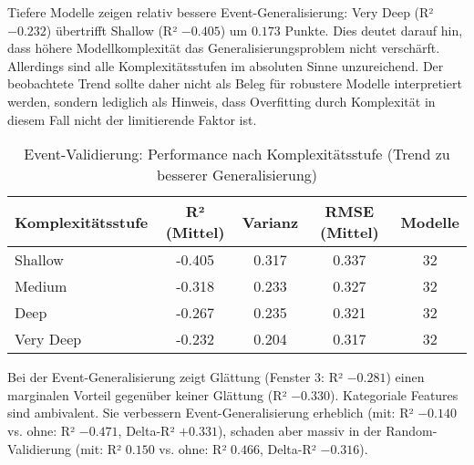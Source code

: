 Tiefere Modelle zeigen relativ bessere Event-Generalisierung: Very Deep (R² $-0.232$) übertrifft Shallow (R² $-0.405$) um $0.173$ Punkte. Dies deutet darauf hin, dass höhere Modellkomplexität das Generalisierungsproblem nicht verschärft. Allerdings sind alle Komplexitätsstufen im absoluten Sinne unzureichend. Der beobachtete Trend sollte daher nicht als Beleg für robustere Modelle interpretiert werden, sondern lediglich als Hinweis, dass Overfitting durch Komplexität in diesem Fall nicht der limitierende Faktor ist.

\begin{table}[H]
  \centering
  \begin{tabular}{lcccc}
    \toprule
    \textbf{Komplexitätsstufe} & \textbf{R² (Mittel)} & \textbf{Varianz} & \textbf{RMSE (Mittel)} & \textbf{Modelle} \\
    \midrule
    Shallow & -0.405 & 0.317 & 0.337 & 32 \\
    Medium & -0.318 & 0.233 & 0.327 & 32 \\
    Deep & -0.267 & 0.235 & 0.321 & 32 \\
    Very Deep & -0.232 & 0.204 & 0.317 & 32 \\
    \bottomrule
  \end{tabular}
  \caption{Event-Validierung: Performance nach Komplexitätsstufe (Trend zu besserer Generalisierung)}
  \label{tab:complexity_event}
\end{table}


Bei der Event-Generalisierung zeigt Glättung (Fenster 3: R² $-0.281$) einen marginalen Vorteil gegenüber keiner Glättung (R² $-0.330$). Kategoriale Features sind ambivalent. Sie verbessern Event-Generalisierung erheblich (mit: R² $-0.140$ vs. ohne: R² $-0.471$, Delta-R² $+0.331$), schaden aber massiv in der Random-Validierung (mit: R² $0.150$ vs. ohne: R² $0.466$, Delta-R² $-0.316$).

